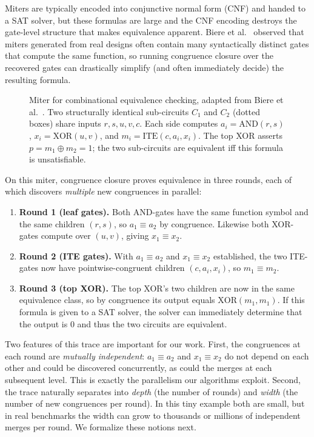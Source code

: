 Miters are typically encoded into conjunctive normal form (CNF) and handed
to a SAT solver, but these formulas are large and the CNF encoding
destroys the gate-level structure that makes equivalence apparent. Biere
et al.~\cite{clausal-cc} observed that miters generated from real designs
often contain many syntactically distinct gates that compute the same
function, so running congruence closure over the recovered gates can
drastically simplify (and often immediately decide) the resulting formula.

\begin{figure}[t]
\centering

\caption{Miter for combinational equivalence checking, adapted from
Biere et al.~\cite{clausal-cc}. Two structurally identical sub-circuits
$C_1$ and $C_2$ (dotted boxes) share inputs $r, s, u, v, c$. Each side
computes $a_i = \mathrm{AND}(r, s)$, $x_i = \mathrm{XOR}(u, v)$, and
$m_i = \mathrm{ITE}(c, a_i, x_i)$. The top XOR asserts $p = m_1 \oplus
m_2 = 1$; the two sub-circuits are equivalent iff this formula is
unsatisfiable.}
\label{fig:miter}
\end{figure}

On this miter, congruence closure proves equivalence in three rounds,
each of which discovers \emph{multiple} new congruences in parallel:

\begin{enumerate}
\item \textbf{Round 1 (leaf gates).} Both AND-gates have the same function
symbol and the same children $(r, s)$, so $a_1 \equiv a_2$ by congruence.
Likewise both XOR-gates compute over $(u, v)$, giving $x_1 \equiv x_2$.
\item \textbf{Round 2 (ITE gates).} With $a_1 \equiv a_2$ and $x_1 \equiv
x_2$ established, the two ITE-gates now have pointwise-congruent children
$(c, a_i, x_i)$, so $m_1 \equiv m_2$.
\item \textbf{Round 3 (top XOR).} The top XOR's two children are now in
the same equivalence class, so by congruence its output equals
$\mathrm{XOR}(m_1, m_1)$. If this formula is given to a SAT solver, 
the solver can immediately determine that the output is $0$ and thus the two 
circuits are equivalent. 
\end{enumerate}

Two features of this trace are important for our work. First, the
congruences at each round are \emph{mutually independent}: $a_1 \equiv
a_2$ and $x_1 \equiv x_2$ do not depend on each other and could be
discovered concurrently, as could the merges at each subsequent level.
This is exactly the parallelism our algorithms exploit. Second, the trace
naturally separates into \emph{depth} (the number of rounds) and
\emph{width} (the number of new congruences per round). In this tiny
example both are small, but in real benchmarks the width can grow
to thousands or millions of independent merges per round. We formalize
these notions next.

